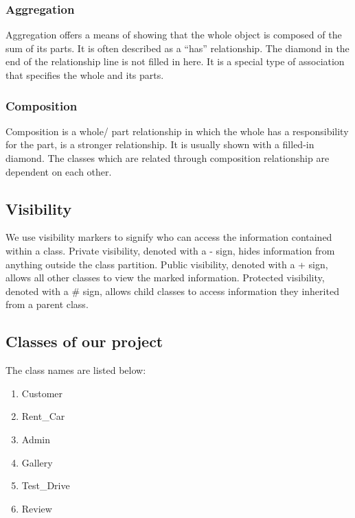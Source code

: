 \noindent 


\noindent 
\subsubsection{ Aggregation}

\noindent Aggregation offers a means of showing that the whole object is composed of the sum of its parts. It is often described as a ``has'' relationship. The diamond in the end of the relationship line is not filled in here. It is a special type of association that specifies the whole and its parts.


\noindent 


\noindent 
\subsubsection{ Composition}

\noindent Composition is a whole/ part relationship in which the whole has a responsibility for the part, is a stronger relationship. It is usually shown with a filled-in diamond. The classes which are related through composition relationship are dependent on each other.



\noindent

\subsection{ Visibility}
\noindent We use visibility markers to signify who can access the information contained within a class. Private visibility, denoted with a - sign, hides information from anything outside the class partition. Public visibility, denoted with a + sign, allows all other classes to view the marked information. Protected visibility, denoted with a \# sign, allows child classes to access information they inherited from a parent class.

\noindent
\noindent

\subsection{ Classes of our project}
\noindent The class names are listed below:

\begin{enumerate}
\item  Customer
\item  Rent\_Car
\item  Admin
\item  Gallery
\item  Test\_Drive
\item  Review
\end{enumerate}

